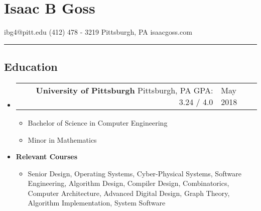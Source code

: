 \documentclass[18pt]{article}
\makeatletter
\providecommand{\tightlist}{
    \setlength{\itemsep}{0pt}\setlength{\parskip}{0pt}
}
\providecommand{\datetable}[2]{
    \begin{tabular*}{\textwidth}{@{}r @{\extracolsep{\fill}} l}
        #1 & #2
    \end{tabular*}
}
\makeatother
\begin{document}
  \section*{Isaac B Goss}\label{isaac-b-goss}
    ibg4@pitt.edu \textbar{} (412) 478 - 3219 \textbar{} Pittsburgh, PA \textbar{} isaacgoss.com
    
    \hrule
    
    \subsection*{Education}\label{education}
        \begin{itemize}[label={}]
        \item \datetable{
            \textbf{University of Pittsburgh} \textbar{} 
            Pittsburgh, PA \textbar{} 
            GPA: 3.24 / 4.0
        }{
            May 2018
        }
        \begin{itemize}[ topsep=0pt]\tightlist
          \item Bachelor of Science in Computer Engineering
          \item Minor in Mathematics
        \end{itemize}
        \item \textbf{Relevant Courses}
            \begin{itemize}[label={}, topsep=0pt]
                \item
                Senior Design,
                Operating Systems,
                Cyber-Physical Systems,
                Software Engineering,
                Algorithm Design,
                Compiler Design,
                Combinatorics,
                Computer Architecture,
                Advanced Digital Design,
                Graph Theory,\\
                Algorithm Implementation,
                System Software
            \end{itemize}
        \end{itemize}
    
\end{document}
